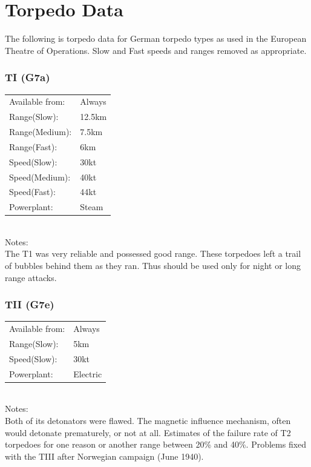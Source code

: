 \documentclass{article}
\begin{document}
\section{Torpedo Data}
The following is torpedo data for German torpedo types as used in the European Theatre of Operations.
Slow and Fast speeds and ranges removed as appropriate.

\subsubsection{TI (G7a)}
\begin{tabular}{l|l}
Available from:& Always\\
Range(Slow):& 12.5km\\
Range(Medium):& 7.5km\\
Range(Fast):& 6km\\
Speed(Slow):&30kt\\
Speed(Medium):&40kt\\
Speed(Fast):&44kt\\
Powerplant:&Steam\\
\end{tabular} \\
Notes:\\
The T1 was very reliable and possessed good range. These torpedoes left a trail of bubbles behind them as they ran. Thus should be used only for night or long range attacks.

\subsubsection{TII (G7e)}
\begin{tabular}{l|l}
Available from:& Always\\
Range(Slow):& 5km\\
Speed(Slow):& 30kt\\
Powerplant:&Electric\\
\end{tabular} \\
Notes:\\
Both of its detonators were flawed. The magnetic influence mechanism, often would detonate prematurely, or not at all. Estimates of the failure rate of T2 torpedoes for one reason or another range between 20\% and 40\%. Problems fixed with the TIII after Norwegian campaign (June 1940).
\end{document}
